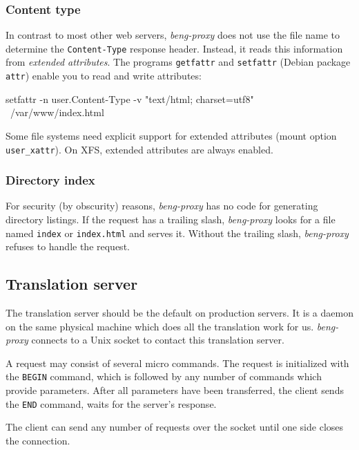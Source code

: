 \documentclass[a4paper,12pt]{article}
\begin{document}
\subsubsection{Content type}
\label{xattr}

In contrast to most other web servers, \emph{beng-proxy} does not use
the file name to determine the \texttt{Content-Type} response header.
Instead, it reads this information from \textit{extended attributes}.
The programs \texttt{getfattr} and \texttt{setfattr} (Debian package
\texttt{attr}) enable you to read and write attributes:

\begin{verbatim*}
setfattr -n user.Content-Type -v "text/html; charset=utf8" \
/var/www/index.html
\end{verbatim*}

Some file systems need explicit support for extended attributes (mount
option \texttt{user\_xattr}).  On
XFS, extended attributes are always enabled.

\subsubsection{Directory index}

For security (by obscurity) reasons, \emph{beng-proxy} has no code for
generating directory listings.  If the request has a trailing slash,
\emph{beng-proxy} looks for a file named \texttt{index} or
\texttt{index.html} and serves it.  Without the trailing slash,
\emph{beng-proxy} refuses to handle the request.


\subsection{Translation server}

The translation server should be the default on production servers.
It is a daemon on the same physical machine which does all the
translation work for us.  \emph{beng-proxy} connects to a Unix socket
to contact this translation server.

A request may consist of several micro commands.  The request is
initialized with the \texttt{BEGIN} command, which is followed by any
number of commands which provide parameters.  After all parameters
have been transferred, the client sends the \texttt{END} command,
waits for the server's response.

The client can send any number of requests over the socket until one
side closes the connection.
\end{document}
